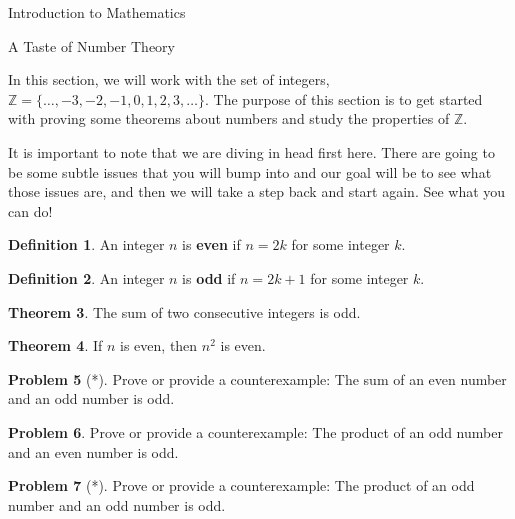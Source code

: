 \documentclass[11pt]{article}
\theoremstyle{definition}
\newtheorem{theorem}{Theorem}[section]
\newtheorem{definition}[theorem]{Definition}
\newtheorem{problem}[theorem]{Problem}
\begin{document}
\addtocounter{section}{0}

\begin{section}{Introduction to Mathematics}

\begin{subsection}{A Taste of Number Theory}


In this section, we will work with the set of integers, $\mathbb{Z} = \{\ldots, -3, -2, -1, 0, 1, 2, 3, \ldots\}$.  The purpose of this section is to get started with proving some theorems about numbers and study the properties of $\mathbb{Z}$.

It is important to note that we are diving in head first here.  There are going to be some subtle issues that you will bump into and our goal will be to see what those issues are, and then we will take a step back and start again.  See what you can do!

\begin{definition}
An integer $n$ is \textbf{even} if $n=2k$ for some integer $k$. \end{definition}

\begin{definition}
An integer $n$ is \textbf{odd} if $n=2k+1$ for some integer $k$. \end{definition}

\begin{theorem}
The sum of two consecutive integers is odd.
\end{theorem}

\begin{theorem}
If $n$ is even, then $n^2$ is even.
\end{theorem}

\begin{problem}[*]
Prove or provide a counterexample:  The sum of an even number and an odd number is odd.
\end{problem}

\begin{problem}
Prove or provide a counterexample: The product of an odd number and an even number is odd.
\end{problem}

\begin{problem}[*]
Prove or provide a counterexample: The product of an odd number and an odd number is odd.
\end{problem}


\end{subsection}
\end{section}
\end{document}
